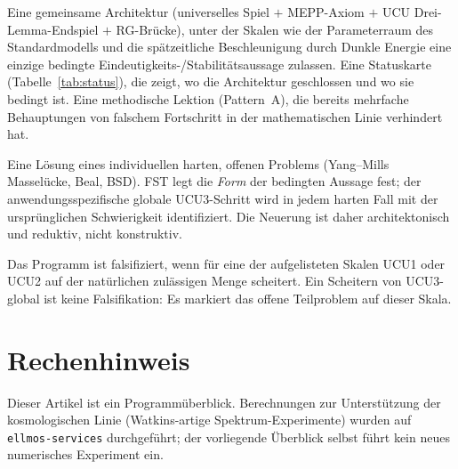 \documentclass[11pt,a4paper]{article}
\theoremstyle{remark}
\begin{document}
\begin{description}[leftmargin=2em,style=nextline]
\item[Was FST liefert.]
Eine gemeinsame Architektur (universelles Spiel $+$ MEPP-Axiom $+$ UCU Drei-Lemma-Endspiel $+$ RG-Brücke), unter der Skalen wie der Parameterraum des Standardmodells und die spätzeitliche Beschleunigung durch Dunkle Energie eine einzige bedingte Eindeutigkeits-/Stabilitätsaussage zulassen. Eine Statuskarte (Tabelle~\ref{tab:status}), die zeigt, wo die Architektur geschlossen und wo sie bedingt ist. Eine methodische Lektion (Pattern~A), die bereits mehrfache Behauptungen von falschem Fortschritt in der mathematischen Linie verhindert hat.

\item[Was FST \emph{nicht} liefert.]
Eine Lösung eines individuellen harten, offenen Problems (Yang--Mills Masselücke, Beal, BSD). FST legt die \emph{Form} der bedingten Aussage fest; der anwendungsspezifische globale UCU3-Schritt wird in jedem harten Fall mit der ursprünglichen Schwierigkeit identifiziert. Die Neuerung ist daher architektonisch und reduktiv, nicht konstruktiv.

\item[Falsifikationskriterium.]
Das Programm ist falsifiziert, wenn für eine der aufgelisteten Skalen UCU1 oder UCU2 auf der natürlichen zulässigen Menge scheitert. Ein Scheitern von UCU3-global ist keine Falsifikation: Es markiert das offene Teilproblem auf dieser Skala.
\end{description}

\section*{Rechenhinweis}
Dieser Artikel ist ein Programmüberblick. Berechnungen zur Unterstützung der kosmologischen Linie (Watkins-artige Spektrum-Experimente) wurden auf \texttt{ellmos-services} durchgeführt; der vorliegende Überblick selbst führt kein neues numerisches Experiment ein.

\end{document}
